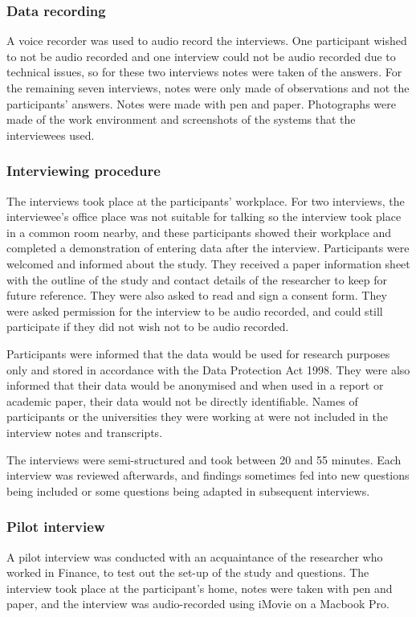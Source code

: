 \subsubsection{Data recording}
A voice recorder was used to audio record the interviews. One participant wished to not be audio recorded and one interview could not be audio recorded due to technical issues, so for these two interviews notes were taken of the answers. For the remaining seven interviews, notes were only made of observations and not the participants' answers. Notes were made with pen and paper. Photographs were made of the work environment and screenshots of the systems that the interviewees used.

\subsubsection{Interviewing procedure}
The interviews took place at the participants' workplace. For two interviews, the interviewee's office place was not suitable for talking so the interview took place in a common room nearby, and these participants showed their workplace and completed a demonstration of entering data after the interview. Participants were welcomed and informed about the study. They received a paper information sheet with the outline of the study and contact details of the researcher to keep for future reference. They were also asked to read and sign a consent form. They were asked permission for the interview to be audio recorded, and could still participate if they did not wish not to be audio recorded. 

Participants were informed that the data would be used for research purposes only and stored in accordance with the Data Protection Act 1998. They were also informed that their data would be anonymised and when used in a report or academic paper, their data would not be directly identifiable. Names of participants or the universities they were working at were not included in the interview notes and transcripts.

The interviews were semi-structured and took between 20 and 55 minutes. Each interview was reviewed afterwards, and findings sometimes fed into new questions being included or some questions being adapted in subsequent interviews.

\subsubsection{Pilot interview}
A pilot interview was conducted with an acquaintance of the researcher who worked in Finance, to test out the set-up of the study and questions. The interview took place at the participant's home, notes were taken with pen and paper, and the interview was audio-recorded using iMovie on a Macbook Pro. 

